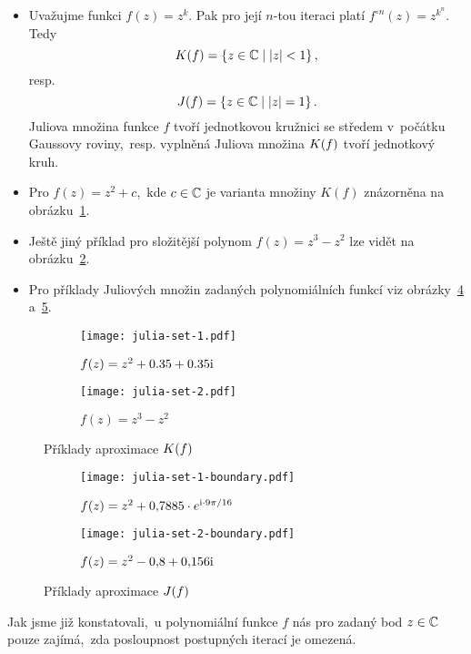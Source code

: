 \begin{example}
    \begin{itemize}
        \item Uvažujme funkci $f(z)=z^k$. Pak pro její $n$-tou iteraci platí $f^{\circ n}(z)=z^{k^n}$. Tedy
        \[K(f)=\left\{z\in\mathbb{C}\mid |z|<1\right\},\]
        resp.
        \[J(f)=\left\{z\in\mathbb{C}\mid|z|=1\right\}.\]
        Juliova množina funkce $f$ tvoří jednotkovou kružnici se středem v~počátku Gaussovy roviny,~resp. vyplněná Juliova množina $K(f)$ tvoří jednotkový kruh.
        \item Pro $f(z)=z^2+c$,~kde $c\in\mathbb{C}$ je varianta množiny $K(f)$ znázorněna na obrázku~\ref{subfig:vyplnena-juliova-mnozina-1}.
        \item Ještě jiný příklad pro složitější polynom $f(z)=z^3-z^2$ lze vidět na obrázku~\ref{subfig:vyplnena-juliova-mnozina-2}.
        \item Pro příklady Juliových množin zadaných polynomiálních funkcí viz obrázky~\ref{subfig:juliova-mnozina-1} a~\ref{subfig:juliova-mnozina-2}.
    \end{itemize}
\end{example}
\begin{figure}[h]
    \centering
    \begin{subfigure}{0.45\textwidth}
        \centering
        \texttt{[image: julia-set-1.pdf]}
        \caption{$f(z)=z^2+0.35 + 0.35\textrm{i}$}
        \label{subfig:vyplnena-juliova-mnozina-1}
    \end{subfigure}
    \qquad
    \begin{subfigure}{0.45\textwidth}
        \centering
        \texttt{[image: julia-set-2.pdf]}
        \caption{$f(z)=z^3-z^2$}
        \label{subfig:vyplnena-juliova-mnozina-2}
    \end{subfigure}
    \caption{Příklady aproximace $K(f)$}
    \label{fig:priklady-vyplnenych-juliovych-mnozin}
\end{figure}
\begin{figure}[h]
    \centering
    \begin{subfigure}{0.45\textwidth}
        \centering
        \texttt{[image: julia-set-1-boundary.pdf]}
        \caption{$f(z)=z^2 + 0{,}7885\cdot e^{\textrm{i}\cdot9\pi/16}$}
        \label{subfig:juliova-mnozina-1}
    \end{subfigure}
    \qquad
    \begin{subfigure}{0.45\textwidth}
        \centering
        \texttt{[image: julia-set-2-boundary.pdf]}
        \caption{$f(z)=z^2 - 0{,}8 + 0{,}156\textrm{i}$}
        \label{subfig:juliova-mnozina-2}
    \end{subfigure}
    \caption{Příklady aproximace $J(f)$}
    \label{fig:priklady-juliovych-mnozin}
\end{figure}
Jak jsme již konstatovali,~u polynomiální funkce $f$ nás pro zadaný bod $z\in\mathbb{C}$ pouze zajímá,~zda posloupnost postupných iterací je omezená.

